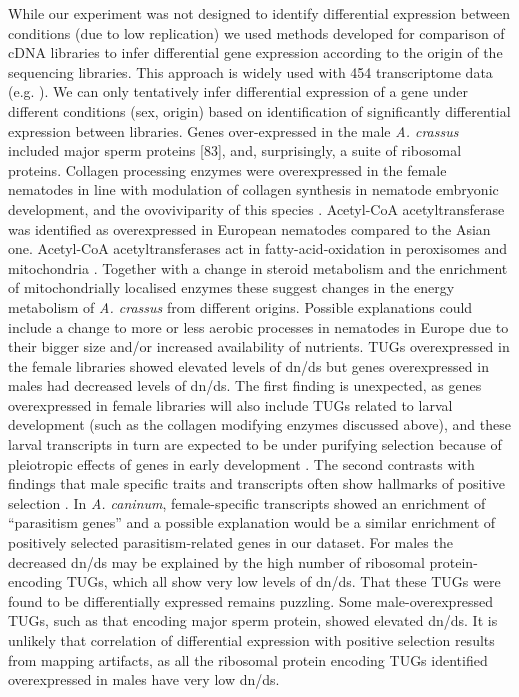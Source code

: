 \documentclass[10pt]{bmc_article}
\newenvironment{bmcformat}{\begin{raggedright}\baselineskip20pt\sloppy\setboolean{publ}{false}}{\end{raggedright}\baselineskip20pt\sloppy}
\begin{document}
\begin{bmcformat}
While our experiment was not designed to identify differential
expression between conditions (due to low replication) we used methods
developed for comparison of cDNA libraries \cite{pmid9331369} to infer
differential gene expression according to the origin of the sequencing
libraries. This approach is widely used with 454 transcriptome data
(e.g. \cite{pmid20470405}). We can only tentatively infer differential
expression of a gene under different conditions (sex, origin) based on
identification of significantly differential expression between
libraries. Genes over-expressed in the male \textit{A. crassus}
included major sperm proteins [83], and, surprisingly, a suite of
ribosomal proteins. Collagen processing enzymes were overexpressed in
the female nematodes in line with modulation of collagen synthesis in
nematode embryonic development, and the ovoviviparity of this species
\cite{pmid10637627}. Acetyl-CoA acetyltransferase was identified as
overexpressed in European nematodes compared to the Asian
one. Acetyl-CoA acetyltransferases act in fatty-acid-oxidation in
peroxisomes and mitochondria \cite{pmid4721607}. Together with a
change in steroid metabolism and the enrichment of mitochondrially
localised enzymes these suggest changes in the energy metabolism of
\textit{A. crassus} from different origins. Possible explanations
could include a change to more or less aerobic processes in nematodes
in Europe due to their bigger size and/or increased availability of
nutrients.  TUGs overexpressed in the female libraries showed elevated
levels of dn/ds but genes overexpressed in males had decreased levels
of dn/ds. The first finding is unexpected, as genes overexpressed in
female libraries will also include TUGs related to larval development
(such as the collagen modifying enzymes discussed above), and these
larval transcripts in turn are expected to be under purifying
selection because of pleiotropic effects of genes in early development
\cite{pmid15371532}. The second contrasts with findings that male
specific traits and transcripts often show hallmarks of positive
selection \cite{pmid15795858, pmid11404480}. In \textit{A. caninum},
female-specific transcripts showed an enrichment of “parasitism
genes'' \cite{pmid20470405} and a possible explanation would be a
similar enrichment of positively selected parasitism-related genes in
our dataset. For males the decreased dn/ds may be explained by the
high number of ribosomal protein-encoding TUGs, which all show very
low levels of dn/ds. That these TUGs were found to be differentially
expressed remains puzzling. Some male-overexpressed TUGs, such as that
encoding major sperm protein, showed elevated dn/ds. It is unlikely
that correlation of differential expression with positive selection
results from mapping artifacts, as all the ribosomal protein encoding
TUGs identified overexpressed in males have very low dn/ds.\\


\end{bmcformat}
\end{document}
